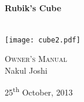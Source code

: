 \begin{titlepage}
\begin{center}


\HRule \\[0.4cm]
{ \huge \bfseries Rubik's Cube \\[0.4cm] }
\HRule \\[0.5cm]
\begin{center}
\texttt{[image: cube2.pdf]}~
\end{center}
\textsc{\LARGE  Owner's Manual}\\[1.5cm]




Nakul Joshi

\vfill

{\large 25\textsuperscript{th} October, 2013}

\end{center}
\end{titlepage}
